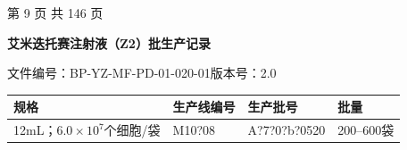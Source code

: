 \documentclass[UTF8,10pt,a4paper,fontset=fandol]{ctexart}
\newcommand{\fieldvalue}[1]{#1}
\newcommand{\handwritten}[1]{#1}
\begin{document}
\begin{center}
第 9 页 共 146 页
\end{center}

\newpage

\begin{center}
\textbf{艾米迭托赛注射液（Z2）批生产记录}

文件编号：BP-YZ-MF-PD-01-020-01\qquad 版本号：2.0
\end{center}

\begin{tabularx}{\textwidth}{|l|X|X|l|}
\hline
\textbf{规格} & \textbf{生产线编号} & \textbf{生产批号} & \textbf{批量} \\
\hline
12mL；$6.0\times10^{7}$个细胞/袋 &
\fieldvalue{\handwritten{M10?08}} &
\fieldvalue{\handwritten{A?7?0?b?0520}} &
200--600袋 \\
\hline
\end{tabularx}

\vspace{4pt}
\end{document}
